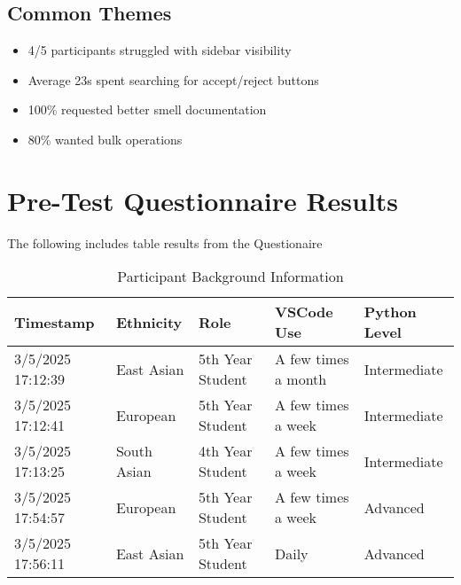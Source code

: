 \documentclass{article}
\begin{document}
\subsection{Common Themes}
\begin{itemize}
\item 4/5 participants struggled with sidebar visibility
\item Average 23s spent searching for accept/reject buttons
\item 100\% requested better smell documentation
\item 80\% wanted bulk operations
\end{itemize}



\section{Pre-Test Questionnaire Results}
The following includes table results from the Questionaire 

\begin{table}[H]
    \centering
    \caption{Participant Background Information}
    \label{tab:background} 
    \begin{tabularx}{\textwidth}{p{2cm}p{3cm}p{2.5cm}p{2cm}p{2cm}}
    \toprule
    \textbf{Timestamp} & \textbf{Ethnicity} & \textbf{Role} & \textbf{VSCode Use} & \textbf{Python Level} \\
    \midrule
    3/5/2025 17:12:39 & East Asian & 5th Year Student & A few times a month & Intermediate \\
    3/5/2025 17:12:41 & European & 5th Year Student & A few times a week & Intermediate \\
    3/5/2025 17:13:25 & South Asian & 4th Year Student & A few times a week & Intermediate \\
    3/5/2025 17:54:57 & European & 5th Year Student & A few times a week & Advanced \\
    3/5/2025 17:56:11 & East Asian & 5th Year Student & Daily & Advanced \\
    \bottomrule
    \end{tabularx}
\end{table}
\end{document}
